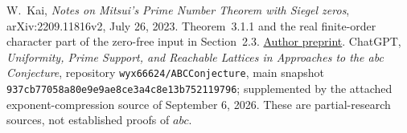  W.~Kai, \emph{Notes on Mitsui's Prime Number Theorem with Siegel zeros}, arXiv:2209.11816v2, July 26, 2023. Theorem~3.1.1 and the real finite-order character part of the zero-free input in Section~2.3. \href{https://arxiv.org/abs/2209.11816v2}{Author preprint}.
 ChatGPT, \emph{Uniformity, Prime Support, and Reachable Lattices in Approaches to the abc Conjecture}, repository \texttt{wyx66624/ABCConjecture}, main snapshot \texttt{937cb77058a80e9e9ae8ce3a4c8e13b752119796}; supplemented by the attached exponent-compression source of September 6, 2026. These are partial-research sources, not established proofs of $abc$.

